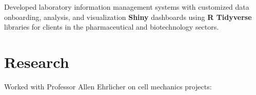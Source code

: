 \documentclass[]{jidicula-resume}
\begin{document}
\vspace{\topsep} %
\begin{tightemize}
\item Developed laboratory information management systems with customized data
  onboarding, analysis, and visualization \textbf{Shiny} dashboards using \textbf{R Tidyverse} libraries
  for clients in the pharmaceutical and biotechnology sectors.
\end{tightemize}
\sectionsep{}

\section{Research}
Worked with Professor Allen Ehrlicher on cell mechanics projects:
\end{document}
